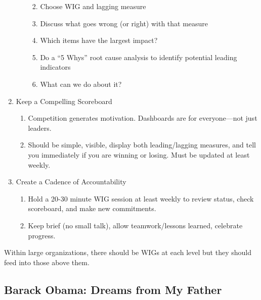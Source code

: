 \documentclass[
]{article}
\begin{document}
\begin{enumerate}
\begin{enumerate}
    \begin{enumerate}
    \def\labelenumiii{\arabic{enumiii}.}
    \setcounter{enumiii}{5}
    \item
      Choose WIG and lagging measure
    \item
      Discuss what goes wrong (or right) with that measure
    \item
      Which items have the largest impact?
    \item
      Do a ``5 Whys'' root cause analysis to identify potential leading
      indicators
    \item
      What can we do about it?
    \end{enumerate}
  \end{enumerate}
\item
  Keep a Compelling Scoreboard

  \begin{enumerate}
  \def\labelenumii{\arabic{enumii}.}
  \setcounter{enumii}{5}
  \item
    Competition generates motivation. Dashboards are for everyone---not
    just leaders.
  \item
    Should be simple, visible, display both leading/lagging measures,
    and tell you immediately if you are winning or losing. Must be
    updated at least weekly.
  \end{enumerate}
\item
  Create a Cadence of Accountability

  \begin{enumerate}
  \def\labelenumii{\arabic{enumii}.}
  \setcounter{enumii}{7}
  \item
    Hold a 20-30 minute WIG session at least weekly to review status,
    check scoreboard, and make new commitments.
  \item
    Keep brief (no small talk), allow teamwork/lessons learned,
    celebrate progress.
  \end{enumerate}
\end{enumerate}

Within large organizations, there should be WIGs at each level but they
should feed into those above them.

\hypertarget{barack-obama-dreams-from-my-father}{%
\subsection{Barack Obama: Dreams from My
Father}\label{barack-obama-dreams-from-my-father}}
\end{document}
